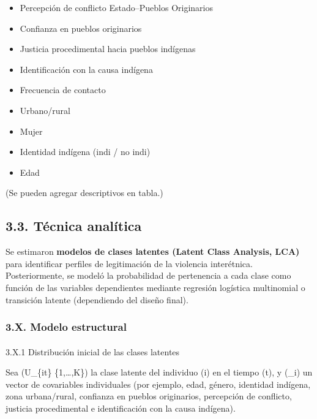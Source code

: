 \documentclass[
  letterpaper,
  DIV=11,
  numbers=noendperiod]{scrartcl}
\makeatletter
\let\oldparagraph\paragraph
\renewcommand{\paragraph}{
    \@ifstar
      \xxxParagraphStar
      \xxxParagraphNoStar
  }
\newcommand{\xxxParagraphStar}[1]{\oldparagraph*{#1}\mbox{}}
\newcommand{\xxxParagraphNoStar}[1]{\oldparagraph{#1}\mbox{}}
\providecommand{\tightlist}{%
  \setlength{\itemsep}{0pt}\setlength{\parskip}{0pt}}\usepackage{longtable,booktabs,array}
\makeatother
\begin{document}
\begin{itemize}
\tightlist
\item
  Percepción de conflicto Estado--Pueblos Originarios\\
\item
  Confianza en pueblos originarios\\
\item
  Justicia procedimental hacia pueblos indígenas\\
\item
  Identificación con la causa indígena\\
\item
  Frecuencia de contacto\\
\item
  Urbano/rural\\
\item
  Mujer\\
\item
  Identidad indígena (indi / no indi)\\
\item
  Edad
\end{itemize}

(Se pueden agregar descriptivos en tabla.)

\subsection{3.3. Técnica analítica}\label{tuxe9cnica-analuxedtica}

Se estimaron \textbf{modelos de clases latentes (Latent Class Analysis,
LCA)} para identificar perfiles de legitimación de la violencia
interétnica. Posteriormente, se modeló la probabilidad de pertenencia a
cada clase como función de las variables dependientes mediante regresión
logística multinomial o transición latente (dependiendo del diseño
final).

\subsubsection{3.X. Modelo estructural}\label{x.-modelo-estructural}

\paragraph{3.X.1 Distribución inicial de las clases
latentes}\label{x.1-distribuciuxf3n-inicial-de-las-clases-latentes}

Sea (U\_\{it\} \in \{1,\dots,K\}) la clase latente del individuo (i) en
el tiempo (t), y (\_i) un vector de covariables individuales
(por ejemplo, edad, género, identidad indígena, zona urbana/rural,
confianza en pueblos originarios, percepción de conflicto, justicia
procedimental e identificación con la causa indígena).
\end{document}

